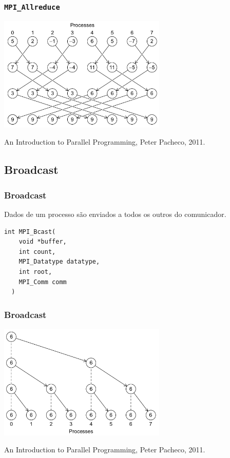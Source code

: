 \documentclass[xcolor={usenames,dvipsnames},12pt,presentation,aspectratio=169]{beamer}
\begin{document}
\begin{frame}
  \frametitle{\texttt{MPI_Allreduce}}
  \vspace{-3mm}
  \begin{center}
	\includegraphics[width=0.6\textwidth]{allreduce2.png}
  \end{center}
  \vspace{-4mm}
  {\tiny An Introduction to Parallel Programming, Peter Pacheco, 2011.}
\end{frame}
\subsection{Broadcast}
\begin{frame}[fragile]
  \frametitle{Broadcast}
  Dados de um processo são enviados a todos os outros do comunicador.
\begin{center}
\begin{minipage}{0.95\textwidth}
  \begin{verbatim}
int MPI_Bcast( 
    void *buffer,
    int count,
    MPI_Datatype datatype,
    int root, 
    MPI_Comm comm
  )
  \end{verbatim}
\end{minipage}
\end{center}
\end{frame}
\begin{frame}
  \frametitle{Broadcast}
  \vspace{-3mm}
  \begin{center}
	\includegraphics[width=0.6\textwidth]{bcast.png}
  \end{center}
  \vspace{-4mm}
  {\tiny An Introduction to Parallel Programming, Peter Pacheco, 2011.}
\end{frame}
\end{document}
